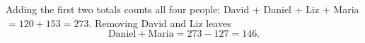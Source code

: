Adding the first two totals counts all four people: David $+$ Daniel $+$ Liz $+$ Maria $=120+153=273$. Removing David and Liz leaves
\[\text{Daniel}+\text{Maria}=273-127=\boxed{146}.\]

